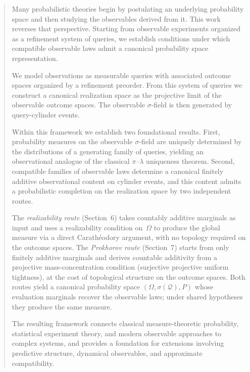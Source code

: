 
\maketitle

\begin{abstract}
Many probabilistic theories begin by postulating an underlying
probability space and then studying the observables derived from it.
This work reverses that perspective.  Starting from observable
experiments organized as a refinement system of queries, we establish
conditions under which compatible observable laws admit a canonical
probability space representation.

We model observations as measurable queries with associated outcome
spaces organized by a refinement preorder. From this system of queries
we construct a canonical realization space as the projective limit of
the observable outcome spaces. The observable $\sigma$-field is then
generated by query-cylinder events.

Within this framework we establish two foundational results. First,
probability measures on the observable $\sigma$-field are uniquely
determined by the distributions of a generating family of queries,
yielding an observational analogue of the classical $\pi$--$\lambda$
uniqueness theorem. Second, compatible families of observable laws
determine a canonical finitely additive observational content on
cylinder events, and this content admits a probabilistic completion
on the realization space by two independent routes.

The \emph{realizability route} (Section~6) takes countably additive
marginals as input and uses a realizability condition on~$\Omega$ to
produce the global measure via a direct Carathéodory argument, with
no topology required on the outcome spaces.  The \emph{Prokhorov route}
(Section~7) starts from only finitely additive marginals and derives
countable additivity from a projective mass-concentration condition
(surjective projective uniform tightness), at the cost of topological
structure on the outcome spaces.  Both routes yield a canonical
probability space $(\Omega,\sigma(\mathcal Q),P)$ whose evaluation
marginals recover the observable laws; under shared hypotheses they
produce the same measure.

The resulting framework connects classical measure-theoretic
probability, statistical experiment theory, and modern observable
approaches to complex systems, and provides a foundation for
extensions involving predictive structure, dynamical observables, and
approximate compatibility.
\end{abstract}

